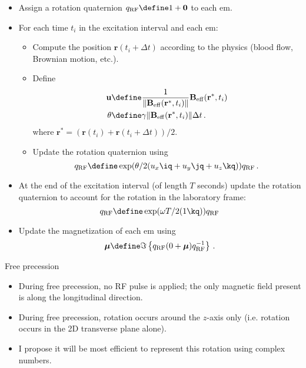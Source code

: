 \documentclass{beamer}
\begin{document}
\begin{frame}
\begin{itemize}
\item Assign a rotation quaternion $q_{\rm RF} \define 1+\mathbf{0}$ to each em.
\item For each time $t_i$ in the excitation interval and each em:
\begin{itemize}
\item Compute the position $\mathbf{r}(t_i+\Delta t)$ according to the physics (blood flow, Brownian motion, etc.).
\item Define
\begin{equation*}
\begin{aligned}
\mathbf{u} &\define \frac{1}{\|\mathbf{B}_{\rm eff}(\mathbf{r}^*,t_i)\|}\mathbf{B}_{\rm eff}(\mathbf{r}^*,t_i)\\
\theta &\define \gamma\|\mathbf{B}_{\rm eff}(\mathbf{r}^*,t_i)\|\Delta t\,.
\end{aligned}
\end{equation*}
where $\mathbf{r}^* = (\mathbf{r}(t_i)+\mathbf{r}(t_i+\Delta t))/2$.
\item Update the rotation quaternion using
\begin{equation*}
q_{\rm RF} \define \exp(\theta/2(u_x\iq+u_y\jq+u_z\kq))q_{\rm RF}\,.
\end{equation*}
\end{itemize}
\end{itemize}
\end{frame}

\begin{frame}
\begin{itemize}
\item At the end of the excitation interval (of length $T$ seconds) update the rotation quaternion to account for the rotation in the laboratory frame:
\begin{equation*}
q_{\rm RF} \define \exp(\omega T/2(1\kq))q_{\rm RF}
\end{equation*}

\item Update the magnetization of each em using
\begin{equation*}
\boldsymbol{\mu} \define \Im\left\lbrace q_{\rm RF} (0+\boldsymbol{\mu}) q_{\rm RF}^{-1}\right\rbrace\,.
\end{equation*}
\end{itemize}
\end{frame}

\begin{frame}{Free precession}
\begin{itemize}
\item During free precession, no RF pulse is applied; the only magnetic field present is along the longitudinal direction.
\item During free precession, rotation occurs around the $z$-axis only (i.e. rotation occurs in the 2D transverse plane alone).
\item I propose it will be most efficient to represent this rotation using complex numbers.
\end{itemize}
\end{frame}
\end{document}
